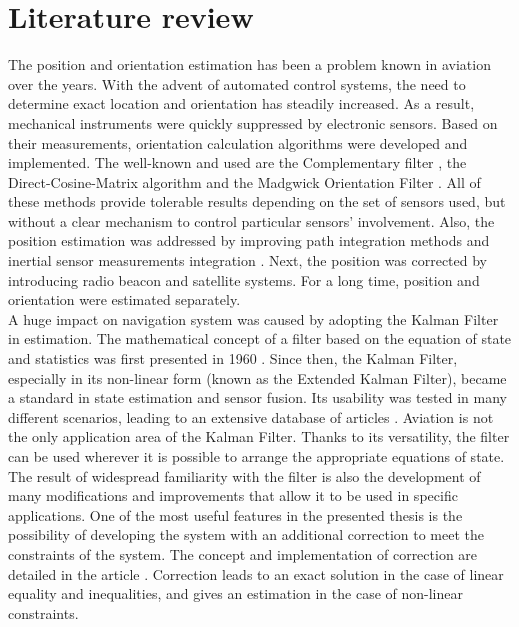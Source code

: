 \chapter{Literature review}

The position and orientation estimation has been a problem known in aviation over the years. With the advent of automated control systems, the need to determine exact location and orientation has steadily increased. As a result, mechanical instruments were quickly suppressed by electronic sensors. Based on their measurements, orientation calculation algorithms were developed and implemented. The well-known and used are the Complementary filter \cite{complementary}, the Direct-Cosine-Matrix algorithm \cite{dcm} and the Madgwick Orientation Filter \cite{madgwick} \cite{Hasan2020}. All of these methods provide tolerable results depending on the set of sensors used, but without a clear mechanism to control particular sensors' involvement.
Also, the position estimation was addressed by improving path integration methods and inertial sensor measurements integration \cite{farrell2012integrated}. Next, the position was corrected by introducing radio beacon and satellite systems. For a long time, position and orientation were estimated separately.\\

A huge impact on navigation system was caused by adopting the Kalman Filter in estimation. The mathematical concept of a filter based on the equation of state and statistics was first presented in 1960 \cite{kalman}. Since then, the Kalman Filter, especially in its non-linear form (known as the Extended Kalman Filter), became a standard in state estimation and sensor fusion. Its usability was tested in many different scenarios, leading to an extensive database of articles \cite{ekf_poor} \cite{s16020264} \cite{s120709566}. Aviation is not the only application area of the Kalman Filter. Thanks to its versatility, the filter can be used wherever it is possible to arrange the appropriate equations of state.\\

The result of widespread familiarity with the filter is also the development of many modifications and improvements that allow it to be used in specific applications. One of the most useful features in the presented thesis is the possibility of developing the system with an additional correction to meet the constraints of the system. The concept and implementation of correction are detailed in the article \cite{simon}. Correction leads to an exact solution in the case of linear equality and inequalities, and gives an estimation in the case of non-linear constraints.\\

